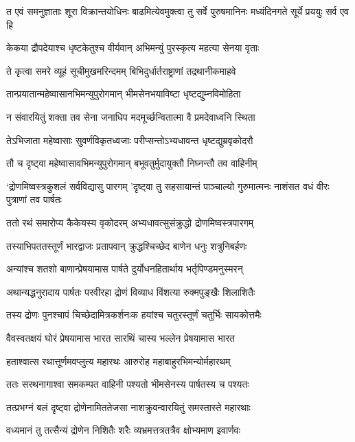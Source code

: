 \threelineshloka
{त एवं समनुज्ञाताः शूरा विक्रान्तयोधिनः}
{बाढमित्येवमुक्त्वा तु सर्वे पुरुषमानिनः}
{मध्यंदिनगते सूर्ये प्रययुः सर्व एव हि}


\twolineshloka
{केकया द्रौपदेयाश्च धृष्टकेतुश्च वीर्यवान्}
{अभिमन्युं पुरस्कृत्य महत्या सेनया वृताः}


\twolineshloka
{ते कृत्वा समरे व्यूहं सूचीमुखमरिन्दमम्}
{बिभिदुर्धार्तराष्ट्राणां तद्रथानीकमाहवे}


\twolineshloka
{तान्प्रयातान्महेष्वासानभिमन्युपुरोगमान्}
{भीमसेनभयाविष्टा धृष्टद्युम्नविमोहिता}


\twolineshloka
{न संवारयितुं शक्ता तव सेना जनाधिप}
{मदमूर्च्छन्वितात्मा वै प्रमदेवाध्वनि स्थिता}


\twolineshloka
{तेऽभिजाता महेष्वासाः सुवर्णविकृतध्वजाः}
{परीप्सन्तोऽभ्यधावन्त धृष्टद्युम्रवृकोदरौ}


\twolineshloka
{तौ च दृष्ट्वा महेष्वासावभिमन्युपुरोगमान्}
{बभूवतुर्मुदायुक्तौ निघ्नन्तौ तव वाहिनीम्}


\threelineshloka
{`द्रोणमिष्वस्त्रकुशलं सर्वविद्यासु पारगम्}
{'दृष्ट्वा तु सहसायान्तं पाञ्चाल्यो गुरुमात्मनः}
{नाशंसत वधं वीरः पुत्राणां तव पार्षतः}


\twolineshloka
{ततो रथं समारोप्य कैकेयस्य वृकोदरम्}
{अभ्यधावत्सुसंक्रुद्धो द्रोणमिष्वस्त्रपारगम्}


\twolineshloka
{तस्याभिपततस्तूर्णं भारद्वाजः प्रतापवान्}
{क्रुद्धश्चिच्छेद बाणेन धनुः शत्रुनिबर्हणः}


\twolineshloka
{अन्यांश्च शतशो बाणान्प्रेषयामास पार्षते}
{दुर्योधनहितार्थाय भर्तृपिण्डमनुस्मरन्}


\twolineshloka
{अथान्यद्धनुरादाय पार्षतः परवीरहा}
{द्रोणं विव्याध विंशत्या रुक्मपुङ्खैः शिलाशितैः}


\twolineshloka
{तस्य द्रोणः पुनश्चापं चिच्छेदामित्रकर्शनःक}
{हयांश्च चतुरस्तूर्णं चतुर्भिः सायकोत्तमैः}


\threelineshloka
{वैवस्वतक्षयं घोरं प्रेषयामास भारत}
{सारथिं चास्य भल्लेन प्रेषयामास भारत}
{}


\twolineshloka
{हताश्वात्स रथात्तूर्णमवप्लुत्य महारथः}
{आरुरोह महाबाहुरभिमन्योर्महारथम्}


\twolineshloka
{ततः सरथनागाश्वा समकम्पत वाहिनी}
{पश्यतो भीमसेनस्य पार्षतस्य च पश्यतः}


\twolineshloka
{तत्प्रभग्नं बलं दृष्ट्वा द्रोणेनामिततेजसा}
{नाशक्रुवन्वारयितुं समस्तास्ते महारथाः}


\twolineshloka
{वध्यमानं तु तत्सैन्यं द्रोणेन निशितैः शरैः}
{व्यभ्रमत्तत्रतत्रैव क्षोभ्यमाण इवार्णवः}


